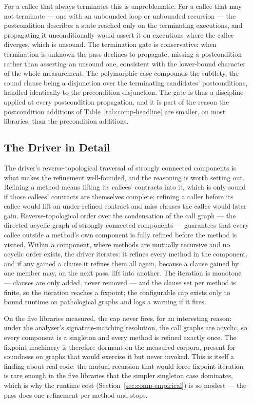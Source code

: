 For a callee that always terminates this is unproblematic. For a callee that may
not terminate --- one with an unbounded loop or unbounded recursion --- the
postcondition describes a state reached only on the terminating executions, and
propagating it unconditionally would assert it on executions where the callee
diverges, which is unsound. The termination gate is conservative: when termination
is unknown the pass declines to propagate, missing a postcondition rather than
asserting an unsound one, consistent with the lower-bound character of the whole
measurement. The polymorphic case compounds the subtlety, the sound clause being a
disjunction over the terminating candidates' postconditions, handled identically to
the precondition disjunction. The gate is thus a discipline applied at every
postcondition propagation, and it is part of the reason the postcondition additions
of Table~\ref{tab:comp-headline} are smaller, on most libraries, than the
precondition additions.

\subsection{The Driver in Detail}

The driver's reverse-topological traversal of strongly connected components is
what makes the refinement well-founded, and the reasoning is worth setting out.
Refining a method means lifting its callees' contracts into it, which is only
sound if those callees' contracts are themselves complete; refining a caller
before its callee would lift an under-refined contract and miss clauses the
callee would later gain. Reverse-topological order over the condensation of the
call graph --- the directed acyclic graph of strongly connected components ---
guarantees that every callee outside a method's own component is fully refined
before the method is visited. Within a component, where methods are mutually
recursive and no acyclic order exists, the driver iterates: it refines every
method in the component, and if any gained a clause it refines them all again,
because a clause gained by one member may, on the next pass, lift into another.
The iteration is monotone --- clauses are only added, never removed --- and the
clause set per method is finite, so the iteration reaches a fixpoint; the
configurable cap exists only to bound runtime on pathological graphs and logs a
warning if it fires.

On the five libraries measured, the cap never fires, for an interesting reason:
under the analyser's signature-matching resolution, the call graphs are acyclic,
so every component is a singleton and every method is refined exactly once. The
fixpoint machinery is therefore dormant on the measured corpora, present for
soundness on graphs that would exercise it but never invoked. This is itself a
finding about real code: the mutual recursion that would force fixpoint iteration
is rare enough in the five libraries that the simpler singleton case dominates,
which is why the runtime cost (Section~\ref{sec:comp-empirical}) is so modest ---
the pass does one refinement per method and stops.

